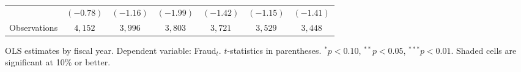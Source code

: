 \documentclass[12pt]{article}
\newcommand{\sig}[1]{\cellcolor{siggreen}#1}
\begin{document}
\begin{table}[h!]
\begin{threeparttable}
\begin{tabular}{lcccccc}
  & $(-0.78)$   & $(-1.16)$   & \sig{$(-1.99)$}       & $(-1.42)$  & $(-1.15)$  & $(-1.41)$ \\[6pt]
Observations
  & $4{,}152$   & $3{,}996$   & $3{,}803$   & $3{,}721$   & $3{,}529$   & $3{,}448$ \\
\bottomrule
\end{tabular}
\begin{tablenotes}
\small\item
OLS estimates by fiscal year. Dependent variable: Fraud$_t$.
$t$-statistics in parentheses. $^{*}p<0.10$, $^{**}p<0.05$, $^{***}p<0.01$.
Shaded cells are significant at 10\% or better.
\end{tablenotes}
\end{threeparttable}
\end{table}

\end{document}
